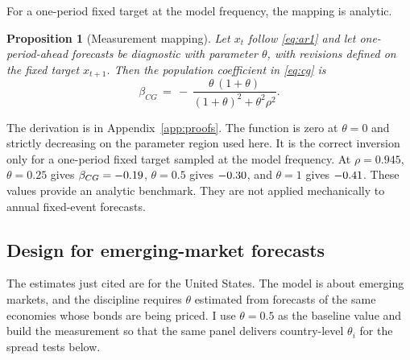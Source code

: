 \documentclass[11pt]{article}
\newtheorem{proposition}{Proposition}
\theoremstyle{definition}
\begin{document}
For a one-period fixed target at the model frequency, the mapping is analytic.

\begin{proposition}[Measurement mapping]\label{prop:cg}
Let $x_t$ follow \eqref{eq:ar1} and let one-period-ahead forecasts be diagnostic with parameter $\theta$, with revisions defined on the fixed target $x_{t+1}$. Then the population coefficient in \eqref{eq:cg} is
\begin{equation}
\beta_{CG} \,=\, -\,\frac{\theta\,(1+\theta)}{(1+\theta)^2 + \theta^2 \rho^2}.
\label{eq:cgmap}
\end{equation}
\end{proposition}

The derivation is in Appendix~\ref{app:proofs}. The function is zero at $\theta=0$ and strictly decreasing on the parameter region used here. It is the correct inversion only for a one-period fixed target sampled at the model frequency. At $\rho=0.945$, $\theta=0.25$ gives $\beta_{CG}=-0.19$, $\theta=0.5$ gives $-0.30$, and $\theta=1$ gives $-0.41$. These values provide an analytic benchmark. They are not applied mechanically to annual fixed-event forecasts.

\subsection{Design for emerging-market forecasts}\label{sec:emdesign}

The estimates just cited are for the United States. The model is about emerging markets, and the discipline requires $\theta$ estimated from forecasts of the same economies whose bonds are being priced. I use $\theta = 0.5$ as the baseline value and build the measurement so that the same panel delivers country-level $\theta_i$ for the spread tests below.
\end{document}
